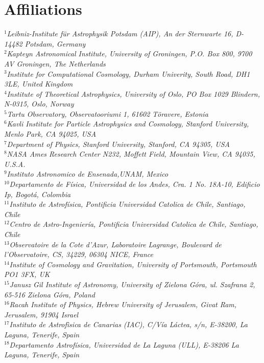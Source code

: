 \documentclass[useAMS,usenatbib]{mnras}
\begin{document}
\section*{Affiliations}
\noindent
{\it
$^1$Leibniz-Institute f\"ur Astrophysik Potsdam (AIP), An der Sternwarte 16, D-14482 Potsdam, Germany\\
$^2$Kapteyn Astronomical Institute, University of Groningen, P.O. Box 800, 9700 AV Groningen, The Netherlands\\
$^3$Institute for Computational Cosmology, Durham Univerity, South Road, DH1 3LE, United Kingdom\\
$^4$Institute of Theoretical Astrophysics, University of Oslo, PO Box 1029 Blindern, N-0315, Oslo, Norway \\
$^5$Tartu Observatory, Observatooriumi 1, 61602 T\~oravere, Estonia \\
$^{6}$Kavli Institute for Particle Astrophysics and Cosmology, Stanford University, Menlo Park, CA 94025, USA\\
$^{7}$Department of Physics, Stanford University, Stanford, CA 94305, USA\\
$^{8}$NASA Ames Research Center N232, Moffett Field, Mountain View, CA 94035, U.S.A.\\
$^{9}$Instituto Astronomico de Ensenada,UNAM, Mexico\\
$^{10}$Departamento de F\'isica, Universidad de los Andes, Cra. 1 No. 18A-10, Edificio Ip, Bogot\'a, Colombia\\
$^{11}$Instituto de Astrof{\'i}sica, Pontificia Universidad Catolica de
Chile, Santiago, Chile\\
$^{12}$Centro de Astro-Ingenier{\'i}a, Pontificia Universidad Catolica
de Chile, Santiago, Chile\\
$^{13}$Observatoire de la Cote d'Azur, Laboratoire Lagrange, Boulevard de l'Observatoire, CS, 34229, 06304 NICE, France\\
$^{14}$Institute of Cosmology and Gravitation, University of Portsmouth, Portsmouth PO1 3FX, UK\\
$^{15}$Janusz Gil Institute of Astronomy, University of Zielona G\'ora, ul. Szafrana 2, 65-516 Zielona G\'ora, Poland\\
$^{16}$Racah Institute of Physics, Hebrew University of Jerusalem, Givat Ram, Jerusalem, 91904 Israel\\
$^{17}$Instituto de Astrof\`{i}sica de Canarias (IAC), C/V\'{i}a L\'{a}ctea, s/n, E-38200, La Laguna, Tenerife, Spain\\
$^{18}$Departamento Astrof\'{i}sica, Universidad de La Laguna (ULL), E-38206 La Laguna, Tenerife, Spain\\
}
\end{document}
